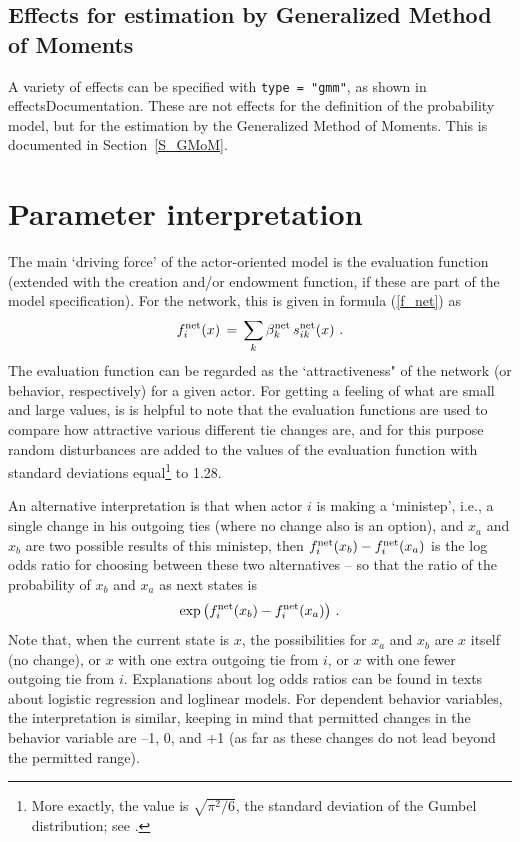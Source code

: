 \documentclass[a4paper,fleqn,11pt]{article}
\newcommand{\+}{\, + \,}
\begin{document}
\subsection{Effects for estimation by Generalized Method of Moments}

A variety of effects can be specified with \texttt{type = "gmm"},
as shown in \textsf{effectsDocumentation}.
These are not effects for the definition of the probability model,
but for the estimation by the Generalized Method of Moments.
This is documented in Section~\ref{S_GMoM}.

\newpage
\section{Parameter interpretation}
\label{S_interpret}

The main `driving force' of the actor-oriented model
is the evaluation function
(extended with the creation and/or endowment function, if these are
part of the model specification).
For the network, this is given in formula (\ref{f_net}) as
\[
f^{\rm net}_i(x) \, = \, \sum_k \beta^{\rm net}_k \, s^{\rm net}_{ik}(x)   \ .
\]
The evaluation function can be regarded as the `attractiveness"
of the network (or behavior, respectively) for a given actor.
For getting a feeling of what are small and large values,
is is helpful to note that the evaluation functions are
used to compare how attractive various different tie changes are,
and for this purpose random disturbances are added
to the values of the evaluation function with standard deviations
equal\footnote{More exactly, the value is $\sqrt{\pi^2/6}$,
the standard deviation of the Gumbel
distribution; see \citet{Snijders01}.} to 1.28.

An alternative interpretation is that when actor $i$ is making
a `ministep', i.e., a single change in his outgoing ties
(where no change also is an option), and
$x_a$ and $x_b$ are two possible results of this ministep,
then $f^{\rm net}_i(x_b) - f^{\rm net}_i(x_a)$ is the log odds ratio
for choosing between these two alternatives -- so that the ratio
of the probability of $x_b$ and $x_a$ as next states is
\[
  \exp\big(f^{\rm net}_i(x_b) - f^{\rm net}_i(x_a)\big) \ .
\]
Note that, when the current state is $x$, the possibilities
for $x_a$ and $x_b$ are $x$ itself (no change), or $x$ with one extra
outgoing tie from $i$, or $x$ with one fewer outgoing tie from $i$.
Explanations about log odds ratios can be found
in texts about logistic regression and loglinear models.
For dependent behavior variables, the interpretation is similar,
keeping in mind that permitted changes in the behavior variable are
--1, 0, and +1 (as far as these changes do not lead beyond the
permitted range).
\end{document}
